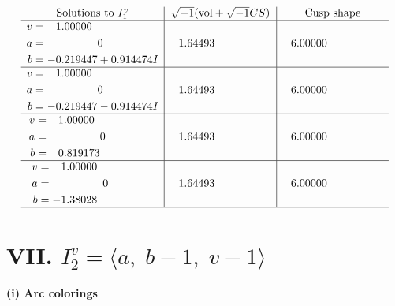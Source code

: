 \documentclass[1p]{elsarticle_modified}
\theoremstyle{definition}
\newcommand{\I}{\sqrt{-1}}
\begin{document}
$$\begin{array}{c|c|c}  
\text{Solutions to }I^v_{1}& \I (\text{vol} + \sqrt{-1}CS) & \text{Cusp shape}\\
 \hline 
\begin{aligned}
v &= \phantom{-}1.00000\phantom{ +0.000000I} \\
a &= \phantom{-0.000000 } 0 \\
b &= -0.219447 + 0.914474 I\end{aligned}
 & \phantom{-}1.64493\phantom{ +0.000000I} & \phantom{-}6.00000\phantom{ +0.000000I} \\ \hline\begin{aligned}
v &= \phantom{-}1.00000\phantom{ +0.000000I} \\
a &= \phantom{-0.000000 } 0 \\
b &= -0.219447 - 0.914474 I\end{aligned}
 & \phantom{-}1.64493\phantom{ +0.000000I} & \phantom{-}6.00000\phantom{ +0.000000I} \\ \hline\begin{aligned}
v &= \phantom{-}1.00000\phantom{ +0.000000I} \\
a &= \phantom{-0.000000 } 0 \\
b &= \phantom{-}0.819173\phantom{ +0.000000I}\end{aligned}
 & \phantom{-}1.64493\phantom{ +0.000000I} & \phantom{-}6.00000\phantom{ +0.000000I} \\ \hline\begin{aligned}
v &= \phantom{-}1.00000\phantom{ +0.000000I} \\
a &= \phantom{-0.000000 } 0 \\
b &= -1.38028\phantom{ +0.000000I}\end{aligned}
 & \phantom{-}1.64493\phantom{ +0.000000I} & \phantom{-}6.00000\phantom{ +0.000000I}\\
 \hline 
 \end{array}$$\newpage\newpage\renewcommand{\arraystretch}{1}
\centering \section*{VII. $I^v_{2}= \langle a,\;b-1,\;v-1 \rangle$}
\flushleft \textbf{(i) Arc colorings}\\
\end{document}

